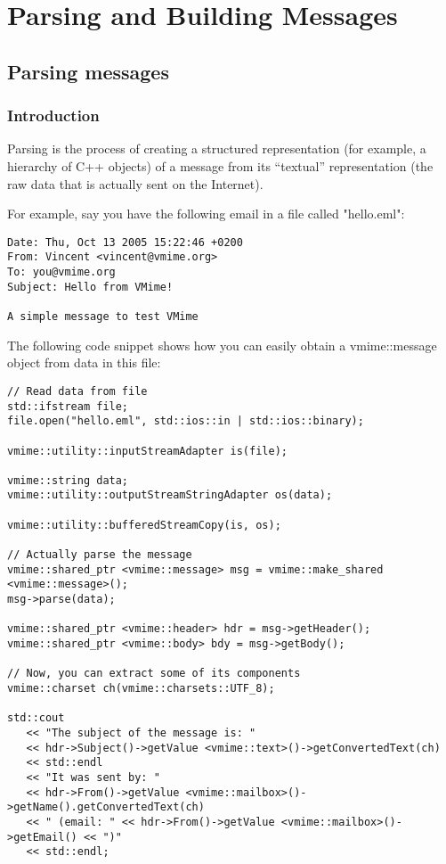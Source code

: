 \chapter{Parsing and Building Messages}

\section{Parsing messages}

\subsection{Introduction} %

Parsing is the process of creating a structured representation (for example,
a hierarchy of C++ objects) of a message from its ``textual'' representation
(the raw data that is actually sent on the Internet).

For example, say you have the following email in a file called "hello.eml":

\begin{verbatim}
Date: Thu, Oct 13 2005 15:22:46 +0200
From: Vincent <vincent@vmime.org>
To: you@vmime.org
Subject: Hello from VMime!

A simple message to test VMime
\end{verbatim}

The following code snippet shows how you can easily obtain a
{\vcode vmime::message} object from data in this file:

\begin{lstlisting}[caption={Parsing a message from a file}]
// Read data from file
std::ifstream file;
file.open("hello.eml", std::ios::in | std::ios::binary);

vmime::utility::inputStreamAdapter is(file);

vmime::string data;
vmime::utility::outputStreamStringAdapter os(data);

vmime::utility::bufferedStreamCopy(is, os);

// Actually parse the message
vmime::shared_ptr <vmime::message> msg = vmime::make_shared <vmime::message>();
msg->parse(data);

vmime::shared_ptr <vmime::header> hdr = msg->getHeader();
vmime::shared_ptr <vmime::body> bdy = msg->getBody();

// Now, you can extract some of its components
vmime::charset ch(vmime::charsets::UTF_8);

std::cout
   << "The subject of the message is: "
   << hdr->Subject()->getValue <vmime::text>()->getConvertedText(ch)
   << std::endl
   << "It was sent by: "
   << hdr->From()->getValue <vmime::mailbox>()->getName().getConvertedText(ch)
   << " (email: " << hdr->From()->getValue <vmime::mailbox>()->getEmail() << ")"
   << std::endl;
\end{lstlisting}

